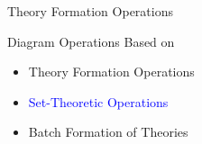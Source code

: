 \documentclass[t,12pt,numbers,fleqn,usenames,xcolor=dvipsnames]{beamer}
\begin{document}
\begin{comment}[fragile]{Theory Formation Operations}
\begin{enumerate}	
	\item[2.] Compose 
	\footnotesize			
	\begin{lstlisting}
diagram d$^{\prime}$ := d$_1$ ; d$_2$
	\end{lstlisting}
	\begin{columns}
		\small
		\begin{column}{0.45\textwidth}
			\begin{block}{\footnotesize Input Diagram}
\begin{tikzcd}
	s \arrow[r,blue] & \dist{d_1}  \\
	\dist{d_1} \arrow[r,blue] & \dist{d_2} 
\end{tikzcd} 
			\end{block}	
		\end{column}
		\begin{column}{ 0.45\textwidth}
			\begin{block}{\footnotesize Output Diagram}
\begin{tikzcd}
	s \arrow[r]  \arrow[out=-30,in=-150,blue,rr] & \dist{d_1} \arrow[r] & \textcolor{blue}{\dist{d_2}} 
\end{tikzcd} 
			\end{block}			
		\end{column}
	\end{columns}
\end{enumerate}
\pause
\footnotesize
\begin{lstlisting}
diagram BiMagma = COMBINE(Magma ; AdditiveMagma) rename { * $\rewrites$ +}
\end{lstlisting}
\begin{tikzcd}
	\dist{Carrier} \arrow[r,hook] & \dist{Magma} \arrow[r,mapsto,blue] & \textcolor{blue}{\pres}
\end{tikzcd}	
\end{comment}

\begin{frame}[fragile]{Theory Formation Operations}

\end{frame}

\begin{frame}[fragile]{Diagram Operations}
Based on 
\begin{itemize}
	\item Theory Formation Operations
	\item \textcolor{Blue}{Set-Theoretic Operations}
	\item Batch Formation of Theories 
\end{itemize}
\end{frame}
\end{document}
